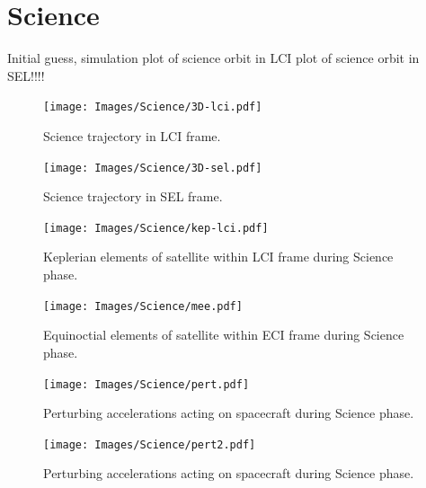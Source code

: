 
\clearpage

\section{Science}
Initial guess, simulation
plot of science orbit in LCI
plot of science orbit in SEL!!!! 

\begin{figure}
\begin{center}
\texttt{[image: Images/Science/3D-lci.pdf]}
\end{center}
\caption{Science trajectory in LCI frame.}
\label{fig:Science-3D-lci}
\end{figure}

\begin{figure}
\begin{center}
\texttt{[image: Images/Science/3D-sel.pdf]}
\end{center}
\caption{Science trajectory in SEL frame.}
\label{fig:Science-3D-sel}
\end{figure}

\begin{figure}
\begin{center}
\texttt{[image: Images/Science/kep-lci.pdf]}
\end{center}
\caption{Keplerian elements of satellite within LCI frame during Science phase.}
\label{fig:Science-kep-lci}
\end{figure}

\begin{figure}
\begin{center}
\texttt{[image: Images/Science/mee.pdf]}
\end{center}
\caption{Equinoctial elements of satellite within ECI frame during Science phase.}
\label{fig:Science-mee}
\end{figure}

\begin{figure}
\begin{center}
\texttt{[image: Images/Science/pert.pdf]}
\end{center}
\caption{Perturbing accelerations acting on spacecraft during Science phase.}
\label{fig:Science-pert}
\end{figure}

\begin{figure}
\begin{center}
\texttt{[image: Images/Science/pert2.pdf]}
\end{center}
\caption{Perturbing accelerations acting on spacecraft during Science phase.}
\label{fig:Science-pert2}
\end{figure}

